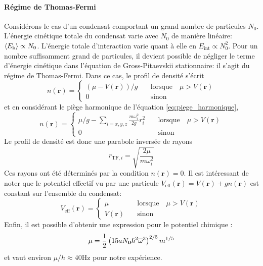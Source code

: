 \paragraph*{Régime de Thomas-Fermi}
Considérons le cas d'un condensat comportant un grand nombre de particules $N_0$. L'énergie cinétique totale du condensat varie avec $N_0$ de manière linéaire: $\left\langle E_{\mathrm{k}}\right\rangle\propto N_0$. L'énergie totale d'interaction varie quant à elle en $E_{\mathrm{int}}\propto N_0^2$. Pour un nombre suffisamment grand de particules, il devient possible de négliger le terme d'énergie cinétique dans l'équation de Gross-Pitaevskii stationnaire: il s'agit du régime de Thomas-Fermi.
Dans ce cas, le profil de densité s'écrit
\begin{equation}
n(\mathbf{r})=\left\{
					\begin{array}{ll}
						(\mu-V(\mathbf{r}))/g &\quad \text{lorsque} \quad \mu>V(\mathbf{r})\\
						0 &\quad \text{sinon}
					\end{array} 
				\right.
\end{equation}
et en considérant le piège harmonique de l'équation \ref{eq:piege_harmonique},
\begin{equation}
n(\mathbf{r})=\left\{
					\begin{array}{ll}
						\mu/g-\sum_{i=x,y,z}\frac{m\omega_i^2}{2g}r_i^2 &\quad \text{lorsque} \quad \mu>V(\mathbf{r})\\
						0 &\quad \text{sinon}
					\end{array} 
				\right.
\end{equation}
Le profil de densité est donc une parabole inversée de rayons
\begin{equation}
r_{\mathrm{TF},i}=\sqrt{\frac{2\mu}{m\omega_i^2}}
\end{equation}
Ces rayons ont été déterminés par la condition $n(\mathbf{r})=0$. Il est intéressant de noter que le potentiel effectif vu par une particule $V_{\mathrm{eff}}(\mathbf{r})=V(\mathbf{r})+gn(\mathbf{r})$ est constant sur l'ensemble du condensat:
\begin{equation}
V_{\mathrm{eff}}(\mathbf{r})= \left\{
									\begin{array}{ll}
										\mu &\quad \text{lorsque} \quad \mu>V(\mathbf{r})\\
										V(\mathbf{r}) &\quad \text{sinon}
									\end{array}
							\right.
\end{equation}
Enfin, il est possible d'obtenir une expression pour le potentiel chimique \citep{pethick2008bose}: 
\begin{equation}
\mu=\frac{1}{2} \left( 15a N_{\mathbf{0}} \hslash^2 \overline{\omega}^3 \right) ^{2/5} m^{1/5}
\end{equation}
et vaut environ $\mu/h\approx40$Hz pour notre expérience.

